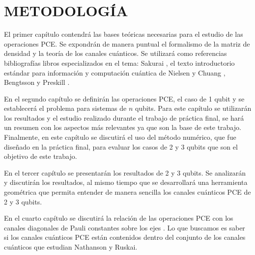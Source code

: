 \chapter{METODOLOGÍA}

El primer capítulo contendrá las bases teóricas necesarias para 
el estudio de las operaciones PCE. Se expondrán de manera puntual el 
formalismo de la matriz de densidad y la teoría de los canales cuánticos.
Se utilizará como referencias bibliografías libros especializados en 
el tema: Sakurai \cite{sakurai_napolitano_2017}, 
el texto introductorio estándar para información y computación cuántica de 
Nielsen y Chuang \cite{nielsen_chuang_2011}, Bengtsson 
\cite{bengtsson_zyczkowski_2017} y Preskill \cite{preskill1998lecture}.

En el segundo capítulo se definirán las operaciones PCE, el caso de 
1 qubit y se establecerá el problema para sistemas de $n$ qubits.
Para este capítulo se utilizarán los resultados y el estudio realizado 
durante el trabajo de práctica final, se hará un resumen con los 
aspectos más relevantes ya que son la base de este trabajo. 
Finalmente, en este capítulo se discutirá el uso del método numérico, 
que fue diseñado en la práctica final, para evaluar los casos de 2 y 3 qubits
que son el objetivo de este trabajo.

En el tercer capítulo se presentarán los resultados de 2 y 3 qubits. Se 
analizarán y discutirán los resultados, al mismo tiempo que se desarrollará 
una herramienta geométrica que permita entender de manera sencilla 
los canales cuánticos PCE de 2 y 3 qubits.

En el cuarto capítulo se discutirá la relación de las operaciones PCE con 
los canales diagonales de Pauli constantes sobre los ejes 
\cite{nathanson2007pauli}. Lo que buscamos es saber si los canales cuánticos
PCE están contenidos dentro del conjunto de los canales cuánticos que
estudian Nathanson y Ruskai. 


